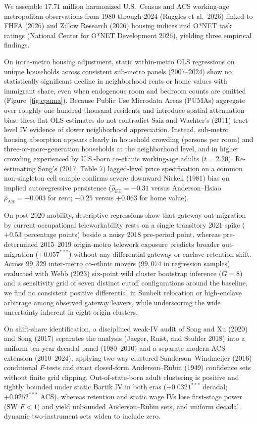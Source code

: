 \documentclass[11pt]{article}
\begin{document}
We assemble $17.71$ million harmonized U.S.\ Census and ACS working-age metropolitan observations from 1980 through 2024 (Ruggles et al.\ 2026) linked to FHFA (2026) and Zillow Research (2026) housing indices and O*NET task ratings (National Center for O*NET Development 2026), yielding three empirical findings.

On intra-metro housing adjustment, static within-metro OLS regressions on unique households across consistent sub-metro panels (2007--2024) show no statistically significant decline in neighborhood rents or home values with immigrant share, even when endogenous room and bedroom counts are omitted (Figure~\ref{fig:cpuma}). Because Public Use Microdata Areas (PUMAs) aggregate over roughly one hundred thousand residents and introduce spatial attenuation bias, these flat OLS estimates do not contradict Saiz and Wachter's (2011) tract-level IV evidence of slower neighborhood appreciation. Instead, sub-metro housing absorption appears clearly in household crowding (persons per room) and three-or-more-generation households at the neighborhood level, and in higher crowding experienced by U.S.-born co-ethnic working-age adults ($t = 2.20$). Re-estimating Song's (2017, Table 7) lagged-level price specification on a common non-singleton cell sample confirms severe downward Nickell (1981) bias on implied autoregressive persistence ($\hat{\rho}_{\text{FE}} = -0.31$ versus Anderson--Hsiao $\hat{\rho}_{\text{AH}} = -0.003$ for rent; $-0.25$ versus $+0.063$ for home value).

On post-2020 mobility, descriptive regressions show that gateway out-migration by current occupational teleworkability rests on a single transitory 2021 spike ($+0.53$ percentage points) beside a noisy 2018 pre-period point, whereas pre-determined 2015--2019 origin-metro telework exposure predicts broader out-migration ($+0.057^{***}$) without any differential gateway or enclave-retention shift. Across $99{,}329$ inter-metro co-ethnic movers ($99{,}074$ in regression samples) evaluated with Webb (2023) six-point wild cluster bootstrap inference ($G = 8$) and a sensitivity grid of seven distinct cutoff configurations around the baseline, we find no consistent positive differential in Sunbelt relocation or high-enclave arbitrage among observed gateway leavers, while underscoring the wide uncertainty inherent in eight origin clusters.

On shift-share identification, a disciplined weak-IV audit of Song and Xu (2020) and Song (2017) separates the analysis (Jaeger, Ruist, and Stuhler 2018) into a uniform ten-year decadal panel (1980--2010) and a separate modern ACS extension (2010--2024), applying two-way clustered Sanderson--Windmeijer (2016) conditional $F$-tests and exact closed-form Anderson--Rubin (1949) confidence sets without finite grid clipping. Out-of-state-born adult clustering is positive and tightly bounded under static Bartik IV in both eras ($+0.0321^{***}$ decadal; $+0.0252^{***}$ ACS), whereas retention and static wage IVs lose first-stage power (SW $F < 1$) and yield unbounded Anderson--Rubin sets, and uniform decadal dynamic two-instrument sets widen to include zero.
\end{document}
